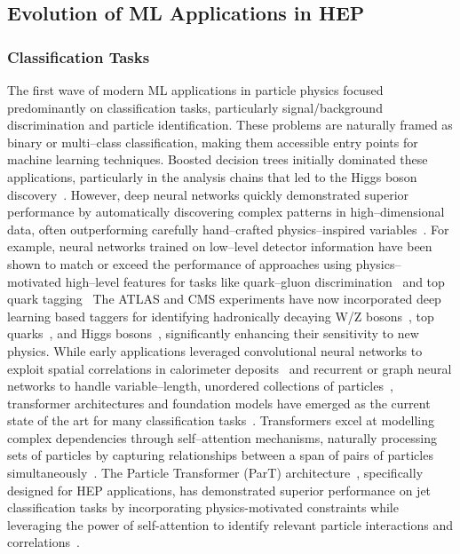 \subsection{Evolution of ML Applications in HEP}
\subsubsection{Classification Tasks}
        \label{subsubsec:classification-tasks}
The first wave of modern ML applications in particle physics focused predominantly on classification tasks, particularly signal/background discrimination and particle identification.
%
These problems are naturally framed as binary or multi--class classification, making them accessible entry points for machine learning techniques.
%
Boosted decision trees initially dominated these applications, particularly in the analysis chains that led to the Higgs boson discovery~\cite{Chen2014HiggsTrees}.
%
However, deep neural networks quickly demonstrated superior performance by automatically discovering complex patterns in high--dimensional data, often outperforming carefully hand--crafted physics--inspired variables~\cite{Baldi2014SearchingLearning, Baldi2015EnhancedLearning, Baldi2021DeepScience}.
%
For example, neural networks trained on low--level detector information have been shown to match or exceed the performance of approaches using physics--motivated high--level features for tasks like quark--gluon discrimination~\cite{Lee2019Quark-GluonNetworks} and top quark tagging~\cite{Pearkes2017JetTagging}
%
The ATLAS and CMS experiments have now incorporated deep learning based taggers for identifying hadronically decaying W/Z bosons~\cite{Chen2020BoostedLearning}, top quarks~\cite{Sirunyan_2020}, and Higgs bosons~\cite{2023TransformerATLAS}, significantly enhancing their sensitivity to new physics.
%
While early applications leveraged convolutional neural networks to exploit spatial correlations in calorimeter deposits~\cite{deOliveira2016Jet-imagesEdition, Komiske2018DeepDiscrimination} and recurrent or graph neural networks to handle variable--length, unordered collections of particles~\cite{Shlomi2020GraphPhysics, Qu2020ParticleNet:Clouds}, transformer architectures and foundation models have emerged as the current state of the art for many classification tasks~\cite{Qu2022ParticleTagging, Mikuni2025SolvingModels, VanStroud2024TransformersPhysics}.
%
Transformers excel at modelling complex dependencies through self--attention mechanisms, naturally processing sets of particles by capturing relationships between a span of pairs of particles simultaneously~\cite{Vaswani2017AttentionNeed}.
%
The Particle Transformer (ParT) architecture~\cite{Qu2022ParticleTagging}, specifically designed for HEP applications, has demonstrated superior performance on jet classification tasks by incorporating physics-motivated constraints while leveraging the power of self-attention to identify relevant particle interactions and correlations~\cite{Wang2024InterpretingTagging}.

